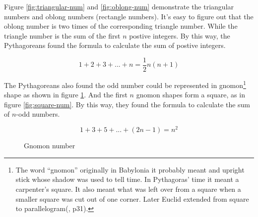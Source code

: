 \documentclass[b5paper]{article}
\begin{document}
Figure \ref{fig:triangular-num} and \ref{fig:oblong-num} demonstrate the triangular numbers and oblong numbers (rectangle numbers). It's easy to figure out that the oblong number is two times of the corresponding triangle number. While the triangle number is the sum of the first $n$ postive integers. By this way, the Pythagoreans found the formula to calculate the sum of postive integers.

\[
1 + 2 + 3 + ... + n = \frac{1}{2}n(n+1)
\]

The Pythagoreans also found the odd number could be represented in gnomon\footnote{The word ``gnomon'' originally in Babylonia it probably meant and upright stick whose shadow was used to tell time. In Pythagoras' time it meant a carpenter's square. It also meant what was left over from a square when a smaller square was cut out of one corner. Later Euclid extended from square to parallelogram(\cite{MKlein1972}, p31).} shape as shown in figure \ref{fig:gnomon-num}. And the first $n$ gnomon shapes form a square, as in figure \ref{fig:square-num}. By this way, they found the formula to calculate the sum of $n$-odd numbers.

\[
1 + 3 + 5 + ... + (2n - 1) = n^2
\]

\begin{figure}[htbp]
\centering
{}
\caption{Gnomon number}
\label{fig:gnomon-num}
\end{figure}
\end{document}
